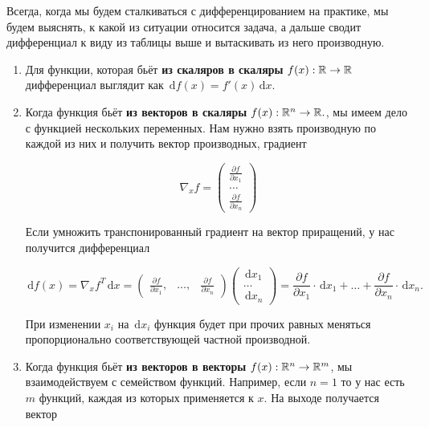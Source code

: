 \documentclass[12pt,fleqn]{article}
\newcommand{\dx}[1]{\,\mathrm{d}#1} %
\begin{document}
Всегда, когда мы будем сталкиваться с дифференцированием на практике, мы будем выяснять, к какой из ситуации относится задача, а дальше сводит дифференциал к виду из таблицы выше и вытаскивать из него производную. 


\begin{enumerate}
\item  Для функции, которая бьёт \textbf{из скаляров в скаляры} $f(x) : \mathbb{R} \to \mathbb{R}$ дифференциал выглядит как $\dx{f(x)} = f'(x) \dx{x}$.

\item Когда функция бьёт \textbf{из векторов в скаляры} $f(x) : \mathbb{R}^n \to \mathbb{R}.$, мы имеем дело с функцией нескольких переменных. Нам нужно взять производную по каждой из них и получить вектор производных, градиент

\[
\nabla_x f = \begin{pmatrix} \frac{\partial f}{\partial x_1} \\ \ldots  \\ \frac{\partial f}{\partial x_n} \end{pmatrix}
\]

Если умножить транспонированный градиент на вектор приращений, у нас получится дифференциал

\[
\dx{f(x)} = \nabla_x f^T \dx{x} = \begin{pmatrix} \frac{\partial f}{\partial x_1}, & \ldots,  & \frac{\partial f}{\partial x_n} \end{pmatrix} \begin{pmatrix} \dx{x_1} \\  \ldots  \\ \dx{x_n} \end{pmatrix} = \frac{\partial f}{\partial x_1} \cdot \dx{x_1} + \ldots +\frac{\partial f}{\partial x_n} \cdot \dx{x_n}.
\]

При изменении $x_i$ на $\dx{x_i}$ функция будет при прочих равных меняться пропорционально соответствующей частной производной. 

\item Когда функция бьёт \textbf{из векторов в векторы} $f(x) : \mathbb{R}^n \to \mathbb{R}^m$, мы взаимодействуем с семейством функций. Например, если $n=1$ то у нас есть $m$ функций, каждая из которых применяется к $x$. На выходе получается вектор 


\end{enumerate}
\end{document}
